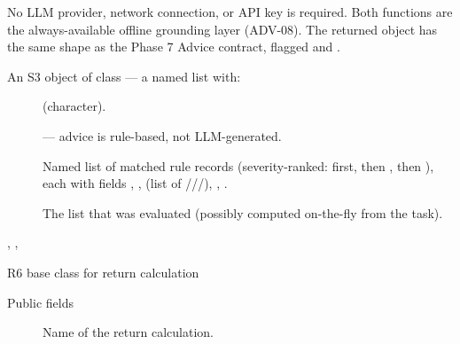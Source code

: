 \documentclass[a4paper]{book}
\begin{document}
%
\begin{Details}
No LLM provider, network connection, or API key is required. Both functions
are the always-available offline grounding layer (ADV-08). The returned
 object has the same shape as the Phase 7 Advice contract,
flagged  and .
\end{Details}
%
\begin{Value}
An S3 object of class  — a named list with:
\begin{description}

\item[]  (character).
\item[]  — advice is rule-based, not LLM-generated.
\item[] Named list of matched rule records (severity-ranked:
 first, then , then ), each with
fields , ,  (list of
///), ,
.
\item[] The  list that was evaluated
(possibly computed on-the-fly from the task).

\end{description}

\end{Value}
%
\begin{SeeAlso}
, ,
\end{SeeAlso}
%
\begin{Examples}
\end{Examples}
%
\begin{Description}
R6 base class for return calculation
\end{Description}
%
\begin{Section}{Public fields}

\begin{description}

\item[] Name of the return calculation.

\end{description}


\end{Section}
\end{document}
